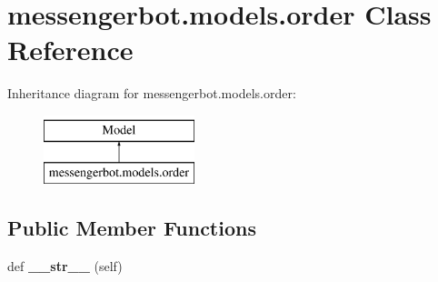 \hypertarget{classmessengerbot_1_1models_1_1order}{}\section{messengerbot.\+models.\+order Class Reference}
\label{classmessengerbot_1_1models_1_1order}
Inheritance diagram for messengerbot.\+models.\+order\+:\begin{figure}[H]
\begin{center}
\leavevmode
\includegraphics[height=2.000000cm]{classmessengerbot_1_1models_1_1order}
\end{center}
\end{figure}
\subsection*{Public Member Functions}
\begin{DoxyCompactItemize}
\item 
\mbox{\label{classmessengerbot_1_1models_1_1order_a5694f24c857261d7c13d4d9e44587bab}} 
def {\bfseries \+\_\+\+\_\+str\+\_\+\+\_\+} (self)
\end{DoxyCompactItemize}
